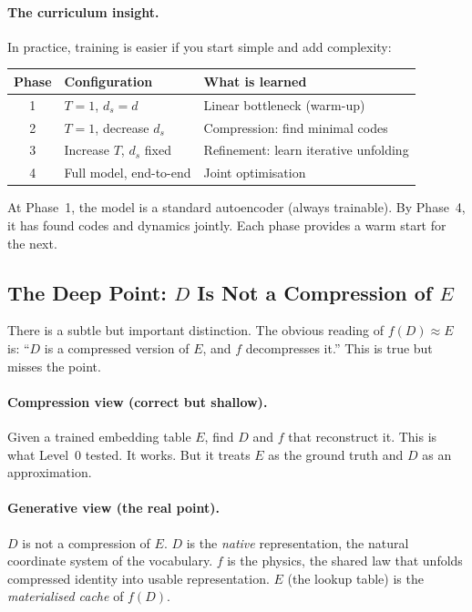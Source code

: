 \documentclass[11pt, a4paper]{article}
\theoremstyle{remark}
\begin{document}
\paragraph{The curriculum insight.}
In practice, training is easier if you start simple and add complexity:
\begin{center}\small
\renewcommand{\arraystretch}{1.2}
\begin{tabular}{cll}
\toprule
\textbf{Phase} & \textbf{Configuration} & \textbf{What is learned} \\
\midrule
1 & $T = 1$, $d_s = d$ & Linear bottleneck (warm-up) \\
2 & $T = 1$, decrease $d_s$ & Compression: find minimal codes \\
3 & Increase $T$, $d_s$ fixed & Refinement: learn iterative unfolding \\
4 & Full model, end-to-end & Joint optimisation \\
\bottomrule
\end{tabular}
\end{center}
At Phase~1, the model is a standard autoencoder (always trainable).
By Phase~4, it has found codes and dynamics jointly.
Each phase provides a warm start for the next.

\subsection{The Deep Point: $D$ Is Not a Compression of $E$}

There is a subtle but important distinction.
The obvious reading of $f(D) \approx E$ is: ``$D$ is a compressed version of $E$, and $f$
decompresses it.''
This is true but misses the point.

\paragraph{Compression view (correct but shallow).}
Given a trained embedding table $E$, find $D$ and $f$ that reconstruct it.
This is what Level~0 tested. It works.
But it treats $E$ as the ground truth and $D$ as an approximation.

\paragraph{Generative view (the real point).}
$D$ is not a compression of $E$.
$D$ is the \emph{native} representation, the natural coordinate system of the vocabulary.
$f$ is the physics, the shared law that unfolds compressed identity into usable representation.
$E$ (the lookup table) is the \emph{materialised cache} of $f(D)$.
\end{document}
